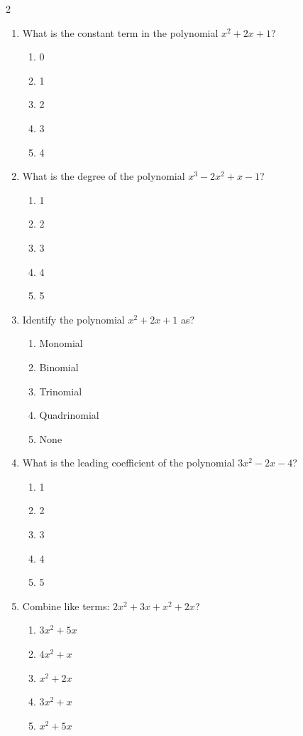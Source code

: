 \documentclass[10pt]{article}
\begin{document}
\begin{multicols}{2}
\begin{enumerate}[label=\textbf{Q\arabic*.}, leftmargin=*, itemsep=6pt, parsep=0pt]
  \item \small What is the constant term in the polynomial $x^2 + 2x + 1$?
  \begin{enumerate}[label=(\Alph*), leftmargin=0.6cm, nosep, itemsep=2pt]
    \item 0
    \item 1
    \item 2
    \item 3
    \item 4
  \end{enumerate}

  \item \small What is the degree of the polynomial $x^3 - 2x^2 + x - 1$?
  \begin{enumerate}[label=(\Alph*), leftmargin=0.6cm, nosep, itemsep=2pt]
    \item 1
    \item 2
    \item 3
    \item 4
    \item 5
  \end{enumerate}

  \item \small Identify the polynomial $x^2 + 2x + 1$ as?
  \begin{enumerate}[label=(\Alph*), leftmargin=0.6cm, nosep, itemsep=2pt]
    \item Monomial
    \item Binomial
    \item Trinomial
    \item Quadrinomial
    \item None
  \end{enumerate}

  \item \small What is the leading coefficient of the polynomial $3x^2 - 2x - 4$?
  \begin{enumerate}[label=(\Alph*), leftmargin=0.6cm, nosep, itemsep=2pt]
    \item 1
    \item 2
    \item 3
    \item 4
    \item 5
  \end{enumerate}

  \item \small Combine like terms: $2x^2 + 3x + x^2 + 2x$?
  \begin{enumerate}[label=(\Alph*), leftmargin=0.6cm, nosep, itemsep=2pt]
    \item $3x^2 + 5x$
    \item $4x^2 + x$
    \item $x^2 + 2x$
    \item $3x^2 + x$
    \item $x^2 + 5x$
  \end{enumerate}

\end{enumerate}
\end{multicols}
\end{document}
